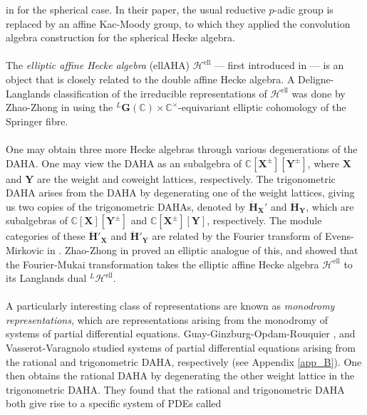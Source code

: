 \documentclass[a4paper]{report}
\theoremstyle{theorem}
\theoremstyle{definition}
\theoremstyle{remark}
\theoremstyle{proposition}
\theoremstyle{conjecture}
\theoremstyle{lemma}
\theoremstyle{corollary}
\theoremstyle{exercise}
\theoremstyle{example}
\newcommand{\C}{\mathbb{C}}
\newcommand{\mcal}{\mathcal}
\newcommand{\on}{\operatorname}
\begin{document}
  in \cite{bk11} for the spherical case. In their paper, the usual reductive 
  $p$-adic group is replaced by an affine Kac-Moody group, to which they applied
  the convolution algebra construction for the spherical Hecke algebra.\\\\
  The \emph{elliptic affine Hecke algebra} (ellAHA) $\mcal{H}^{\on{ell}}$ --- first introduced in \cite{gkv95} --- is an object that is closely related
  to the double affine Hecke algebra. A Deligne-Langlands classification of the irreducible representations 
  of $\mcal{H}^{\on{ell}}$ was done by Zhao-Zhong in \cite{ZZ21} using the 
  ${}^L\mathbf{G}(\C) \times \C^\times$-equivariant elliptic cohomology of the Springer fibre.\\\\
  One may obtain three more Hecke algebras through various degenerations of the DAHA. One may view the DAHA as an subalgebra of $\C[\mathbf{X}^\pm][\mathbf{Y}^\pm]$, where $\mathbf{X}$ and 
  $\mathbf{Y}$ are the weight and coweight lattices, respectively.
  The trigonometric DAHA arises from the DAHA by degenerating one of the weight lattices, giving us two copies of the trigonometric DAHAs, denoted by 
  $\mathbf{\mathbf{\ddot{\mathbf{H}}}}_{\mathbf{X}}'$ and $\mathbf{\ddot{\mathbf{H}}}_{\mathbf{Y}}$, which are 
  subalgebras of $\C[\mathbf{X}][\mathbf{Y}^\pm]$ and $\C[\mathbf{X}^\pm][\mathbf{Y}]$, respectively. The module categories of these $\mathbf{\ddot{\mathbf{H}}}'_\mathbf{X}$ 
  and $\mathbf{\ddot{\mathbf{H}}}'_\mathbf{Y}$ 
  are related by the Fourier transform of Evens-Mirkovic in \cite{em97}. Zhao-Zhong in \cite{ZZ24} proved an elliptic analogue of this, and showed that the Fourier-Mukai 
  transformation takes the elliptic affine Hecke algebra $\mcal{H}^{\on{ell}}$ to its Langlands dual ${}^L\mcal{H}^{\on{ell}}$.\\\\
  A particularly interesting class of representations are known as \emph{monodromy representations}, 
  which are representations arising from the monodromy of systems of partial differential equations.
  Guay-Ginzburg-Opdam-Rouquier \cite{ggor03}, and Vasserot-Varagnolo \cite{vv04} studied systems of 
  partial differential equations arising from the rational and trigonometric DAHA, respectively (see Appendix \ref{app_B}). 
  One then obtains the rational DAHA by degenerating 
  the other weight lattice in the trigonometric DAHA. 
  They found that the rational and trigonometric DAHA both give rise to a specific system of PDEs called 
\end{document}
